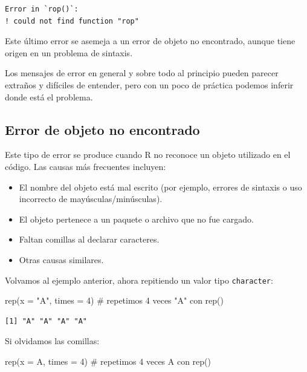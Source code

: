 \documentclass[
  spanish,
  a4paper,
]{scrbook}
\newenvironment{Shaded}{\begin{snugshade}}{\end{snugshade}}
\newcommand{\AttributeTok}[1]{\textcolor[rgb]{0.40,0.45,0.13}{#1}}
\newcommand{\CommentTok}[1]{\textcolor[rgb]{0.37,0.37,0.37}{#1}}
\newcommand{\DecValTok}[1]{\textcolor[rgb]{0.68,0.00,0.00}{#1}}
\newcommand{\FunctionTok}[1]{\textcolor[rgb]{0.28,0.35,0.67}{#1}}
\newcommand{\NormalTok}[1]{\textcolor[rgb]{0.00,0.23,0.31}{#1}}
\newcommand{\StringTok}[1]{\textcolor[rgb]{0.13,0.47,0.30}{#1}}
\begin{document}
\begin{verbatim}
Error in `rop()`:
! could not find function "rop"
\end{verbatim}

Este último error se asemeja a un error de objeto no encontrado, aunque
tiene origen en un problema de sintaxis.

Los mensajes de error en general y sobre todo al principio pueden
parecer extraños y difíciles de entender, pero con un poco de práctica
podemos inferir donde está el problema.

\subsection{Error de objeto no
encontrado}\label{error-de-objeto-no-encontrado}

Este tipo de error se produce cuando R no reconoce un objeto utilizado
en el código. Las causas más frecuentes incluyen:

\begin{itemize}
\item
  El nombre del objeto está mal escrito (por ejemplo, errores de
  sintaxis o uso incorrecto de mayúsculas/minúsculas).
\item
  El objeto pertenece a un paquete o archivo que no fue cargado.
\item
  Faltan comillas al declarar caracteres.
\item
  Otras causas similares.
\end{itemize}

Volvamos al ejemplo anterior, ahora repitiendo un valor tipo
\texttt{character}:

\begin{Shaded}
\begin{Highlighting}[]
\FunctionTok{rep}\NormalTok{(}\AttributeTok{x =} \StringTok{"A"}\NormalTok{, }\AttributeTok{times =} \DecValTok{4}\NormalTok{) }\CommentTok{\# repetimos 4 veces "A" con rep()}
\end{Highlighting}
\end{Shaded}

\begin{verbatim}
[1] "A" "A" "A" "A"
\end{verbatim}

Si olvidamos las comillas:

\begin{Shaded}
\begin{Highlighting}[]
\FunctionTok{rep}\NormalTok{(}\AttributeTok{x =}\NormalTok{ A, }\AttributeTok{times =} \DecValTok{4}\NormalTok{) }\CommentTok{\# repetimos 4 veces A con rep()}
\end{Highlighting}
\end{Shaded}
\end{document}
